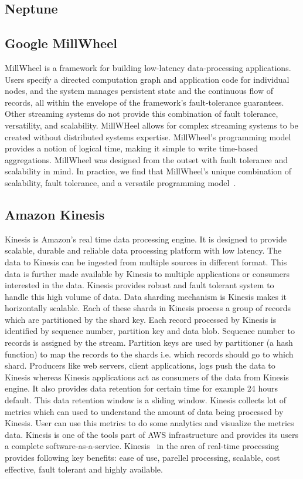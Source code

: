 \subsection{Neptune}

\pv

\subsection{Google MillWheel}

MillWheel is a framework for building low-latency data-processing
applications. Users specify a directed computation graph and
application code for individual nodes, and the system manages
persistent state and the continuous flow of records, all within the
envelope of the framework's fault-tolerance guarantees. Other
streaming systems do not provide this combination of fault tolerance,
versatility, and scalability. MillWHeel allows for complex streaming
systems to be created without distributed systems
expertise. MillWheel's programming model provides a notion of logical
time, making it simple to write time-based aggregations. MillWheel was
designed from the outset with fault tolerance and scalability in
mind. In practice, we find that MillWheel's unique combination of
scalability, fault tolerance, and a versatile programming
model~\cite{millwheel-paper}.

\subsection{Amazon Kinesis}

Kinesis is Amazon's real time data processing engine. It is designed
to provide scalable, durable and reliable data processing platform
with low latency\cite{www-kinesis}.  The data to Kinesis can be
ingested from multiple sources in different format. This data is
further made available by Kinesis to multiple applications or
consumers interested in the data. Kinesis provides robust and fault
tolerant system to handle this high volume of data. Data sharding
mechanism is Kinesis makes it horizontally scalable. Each of these
shards in Kinesis process a group of records which are partitioned by
the shard key. Each record processed by Kinesis is identified by
sequence number, partition key and data blob. Sequence number to
records is assigned by the stream. Partition keys are used by
partitioner (a hash function) to map the records to the shards
i.e. which records should go to which shard. Producers like web
servers, client applications, logs push the data to Kinesis whereas
Kinesis applications act as consumers of the data from Kinesis
engine. It also provides data retention for certain time for example
24 hours default. This data retention window is a sliding
window. Kinesis collects lot of metrics which can used to understand
the amount of data being processed by Kinesis.  User can use this
metrics to do some analytics and visualize the metrics data.  Kinesis
is one of the tools part of AWS infrastructure and provides its users
a complete
software-as-a-service. Kinesis~\cite{big-data-analytics-book} in the
area of real-time processing provides following key benefits: ease of
use, parellel processing, scalable, cost effective, fault tolerant and
highly available.

